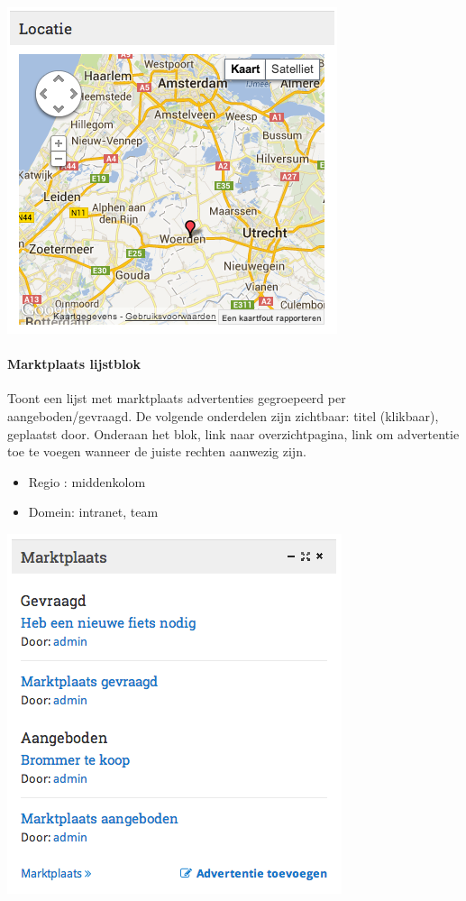 \begin{center}
	\includegraphics[scale=0.5]{img/blokken/googlemaps.png}
\end{center}

\paragraph{Marktplaats lijstblok}

Toont een lijst met marktplaats advertenties gegroepeerd per aangeboden/gevraagd. De volgende onderdelen zijn zichtbaar: titel (klikbaar), geplaatst door. Onderaan het blok, link naar overzichtpagina, link om advertentie toe te voegen wanneer de juiste rechten aanwezig zijn.

\begin{itemize}
\item Regio : middenkolom
\item Domein: intranet, team
\end{itemize}

\begin{center}
	\includegraphics[scale=0.5]{img/blokken/marktplaatslijst.png}
\end{center}

